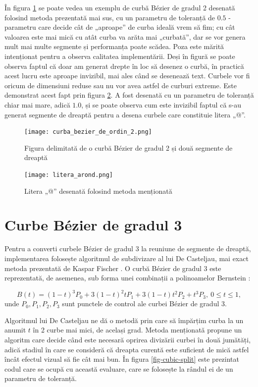 \documentclass[a4paper, 12pt]{report}
\begin{document}
În figura \ref{fig-curba-bezier-de-ordin-2} se poate vedea un exemplu de curbă Bézier de gradul 2 desenată folosind metoda
prezentată mai sus, cu un parametru de toleranță de \(0.5\) - parametru care decide cât de „aproape” de curba ideală vrem
să fim; cu cât valoarea este mai mică cu atât curba va arăta mai „curbată”, dar se vor genera mult mai multe segmente și
performanța poate scădea. Poza este mărită intenționat pentru a observa calitatea implementării. Deși în figură se poate observa
faptul că doar am generat drepte în loc să desenez o curbă, în practică acest lucru este aproape invizibil, mai ales când
se desenează text. Curbele vor fi oricum de dimensiuni reduse sau nu vor avea astfel de curburi extreme. Este demonstrat acest fapt prin figura
\ref{fig-litera-arond}. A fost desenată cu un parametru de toleranță chiar mai mare, adică \(1.0\), și se poate observa cum
este invizibil faptul că s-au generat segmente de dreaptă pentru a desena curbele care constituie litera „@”.

\begin{figure}[ht]
    \texttt{[image: curba\_bezier\_de\_ordin\_2.png]}
    \centering
    \caption{Figura delimitată de o curbă Bézier de gradul 2 și două segmente de dreaptă}
    \label{fig-curba-bezier-de-ordin-2}
\end{figure}

\begin{figure}[ht]
    \texttt{[image: litera\_arond.png]}
    \centering
    \caption{Litera „@” desenată folosind metoda menționată}
    \label{fig-litera-arond}
\end{figure}

\section{Curbe Bézier de gradul 3}

Pentru a converti curbele Bézier de gradul 3 la reuniune de segmente de dreaptă, implementarea folosește algoritmul de subdivizare al lui De Casteljau, mai exact metoda
prezentată de Kaspar Fischer \cite{DeCasteljau_algorithm}. O curbă Bézier de gradul 3 este reprezentată, de asemenea, sub forma unei combinații a
polinoamelor Bernstein \cite{bernstein_polynomial}:

\[
    B(t) = (1 - t)^3 P_0 + 3 (1 - t)^2 t P_1 + 3 (1 - t) t^2 P_2 + t^3 P_3, \ 0 \leq t \leq 1,
\] unde \(P_0, P_1, P_2, P_3\) sunt punctele de control ale curbei Bézier de gradul 3.

Algoritmul lui De Casteljau ne dă o metodă prin care să împărțim curba la un anumit \(t\) în 2 curbe mai mici,
de același grad. Metoda menționată propune un algoritm care decide când este necesară oprirea divizării curbei în două jumătăți,
adică stadiul în care se consideră că dreapta curentă este suficient de mică astfel încât efectul vizual să fie cât mai bun.
În figura \ref{fig-cubic-split} este prezintat codul care se ocupă cu această evaluare, care se folosește la rândul
ei de un parametru de toleranță.
\end{document}
